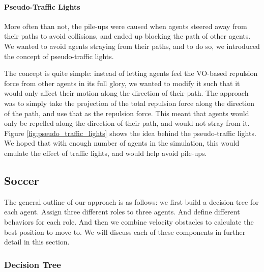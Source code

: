 \documentclass[a4paper,12pt]{article}
\begin{document}
\paragraph{Pseudo-Traffic Lights}
More often than not, the pile-ups were caused when agents steered away from their paths to avoid collisions, and ended up blocking the path of other agents. We wanted to avoid agents straying from their paths, and to do so, we introduced the concept of pseudo-traffic lights.

The concept is quite simple: instead of letting agents feel the VO-based repulsion force from other agents in its full glory, we wanted to modify it such that it would only affect their motion along the direction of their path. The approach was to simply take the projection of the total repulsion force along the direction of the path, and use that as the repulsion force. This meant that agents would only be repelled along the direction of their path, and would not stray from it. Figure \ref{fig:pseudo_traffic_lights} shows the idea behind the pseudo-traffic lights. We hoped that with enough number of agents in the simulation, this would emulate the effect of traffic lights, and would help avoid pile-ups.


\subsection{Soccer}
\label{method_soccer}

The general outline of our approach is as follows: we first build a decision tree for each
agent. Assign three different roles to three agents. And define different behaviors for each role. 
And then we combine velocity obstacles to calculate the best position to move to. 
We will discuss each of these components in further detail in this section.

\subsubsection{Decision Tree}
\thispagestyle{empty}
\end{document}
